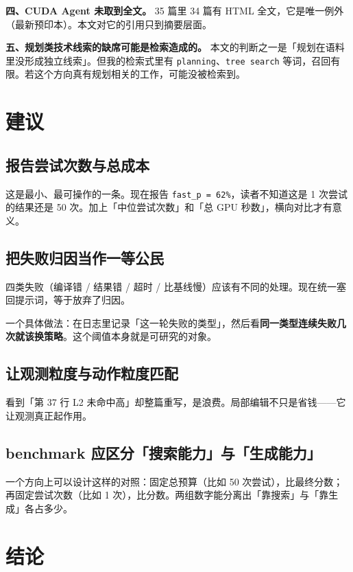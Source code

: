 \textbf{四、CUDA Agent 未取到全文。} 35 篇里 34 篇有 HTML 全文，它是唯一例外（最新预印本）。本文对它的引用只到摘要层面。

\textbf{五、规划类技术线索的缺席可能是检索造成的。} 本文的判断之一是「规划在语料里没形成独立线索」。但我的检索式里有 \texttt{planning}、\texttt{tree search} 等词，召回有限。若这个方向真有规划相关的工作，可能没被检索到。

\section{建议}

\subsection{报告尝试次数与总成本}

这是最小、最可操作的一条。现在报告 \texttt{fast\_p = 62\%}，读者不知道这是 1 次尝试的结果还是 50 次。加上「中位尝试次数」和「总 GPU 秒数」，横向对比才有意义。

\subsection{把失败归因当作一等公民}

四类失败（编译错 / 结果错 / 超时 / 比基线慢）应该有不同的处理。现在统一塞回提示词，等于放弃了归因。

一个具体做法：在日志里记录「这一轮失败的类型」，然后看\textbf{同一类型连续失败几次就该换策略}。这个阈值本身就是可研究的对象。

\subsection{让观测粒度与动作粒度匹配}

看到「第 37 行 L2 未命中高」却整篇重写，是浪费。局部编辑不只是省钱——它让观测真正起作用。

\subsection{benchmark 应区分「搜索能力」与「生成能力」}

一个方向上可以设计这样的对照：固定总预算（比如 50 次尝试），比最终分数；再固定尝试次数（比如 1 次），比分数。两组数字能分离出「靠搜索」与「靠生成」各占多少。

\section{结论}

